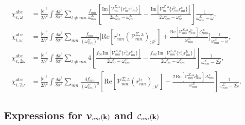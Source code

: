 \documentclass[floatfix,prb,aps,superscriptaddress,showpacs,11pt,preprint,letterpaper]{revtex4}
\begin{document}
\begin{align*}
\chi^{\mathrm{a}\mathrm{b}\mathrm{c}}_{e,\omega}
&= \frac{|e|^3}{2\hbar^2}
\int \frac{dk^3}{8\pi^3}
\sum_{l\ne mn}\frac{f_{mn}}{\omega^\Sigma_{nm}}
\left[
  \frac{\mathrm{Im}\left[\mathcal{V}^{\Sigma,\text{a}}_{ml}
        \{r^{\text{c}}_{ln}
        r^{\text{b}}_{nm}\}\right]}
        {2\omega^\Sigma_{nm}-\omega^\Sigma_{lm}}
 -\frac{\mathrm{Im}\left[\mathcal{V}^{\Sigma,\text{a}}_{ln}
        \{r^{\text{b}}_{nm}
        r^{\text{c}}_{ml}\}\right]}
        {2\omega^\Sigma_{nm}-\omega^\Sigma_{nl}}
\right]\frac{1}{\omega^\Sigma_{nm}-\tilde\omega}
,
\nonumber\\
\chi^{\mathrm{a}\mathrm{b}\mathrm{c}}_{i,\omega}
 &=   \frac{|e|^3}{2\hbar^2}\int \frac{dk^3}{8\pi^3}
\sum_{mn}
    \frac{f_{mn}}{(\omega^{\Sigma}_{nm})^{2}}
\Biggl[
    \mathrm{Re}\left[r^{\text{b}}_{nm}
    \left(\mathcal{V}^{\Sigma,\text{a}}_{mn}\right)_{;k^{\text{c}}}\right]
+   \frac{\mathrm{Re}\left[\mathcal{V}^{\Sigma,\text{a}}_{mn}
    r^{\text{b}}_{nm}\right]\Delta^{\text{c}}_{nm}}{\omega^{\Sigma}_{nm}} 
\Biggr]\frac{1}{\omega^{\Sigma}_{nm}-\tilde\omega}
,
\nonumber\\
\chi^{\mathrm{a}\mathrm{b}\mathrm{c}}_{e,2\omega}
&= \frac{|e|^3}{2\hbar^2}\int \frac{dk^3}{8\pi^3}
\sum_{l\ne mn}
4\left[
  \frac{f_{ln}\,\mathrm{Im}\left[\mathcal{V}^{\Sigma,\text{a}}_{mn}
        \{r^{\text{b}}_{nl}
        r^{\text{c}}_{lm}\}\right]}
        {2\omega^\Sigma_{nl}-\omega^\Sigma_{nm}}
 -\frac{f_{ml}\,\mathrm{Im}\left[\mathcal{V}^{\Sigma,\text{a}}_{mn}
        \{r^{\text{c}}_{nl}
        r^{\text{b}}_{lm}\}\right]}
        {2\omega^\Sigma_{lm}-\omega^\Sigma_{nm}}
\right]\frac{1}{\omega^\Sigma_{nm}-2\tilde\omega}
,
\nonumber\\
\chi^{\mathrm{a}\mathrm{b}\mathrm{c}}_{i,2\omega}
&=  \frac{|e|^3}{2\hbar^2}\int \frac{dk^3}{8\pi^3}
\sum_{mn}
    \frac{4f_{mn}}{(\omega^{\Sigma}_{nm})^{2}}
    \left[\mathrm{Re}\left[\mathcal{V}^{\Sigma,\text{a}}_{mn}
    \left(r^{\text{b}}_{nm}\right)_{;k^{\text{c}}}\right] 
-   \frac{2\,\mathrm{Re}\left[\mathcal{V}^{\Sigma,\text{a}}_{mn}
    r^{\text{b}}_{nm}\right]\Delta^{\text{c}}_{nm}}{\omega^{\Sigma}_{nm}}\right]
    \frac{1}{\omega^{\Sigma}_{nm}-2\tilde\omega}
. 
\end{align*}

\subsection{ Expressions for 
\texorpdfstring{${\boldsymbol{\mathcal{\cal V}}}_{nm}(\mathbf{k})$}{que} 
and 
\texorpdfstring{${\cal C}_{nm}(\mathbf{k})$}{que}
}\label{calpcalc}
\end{document}
